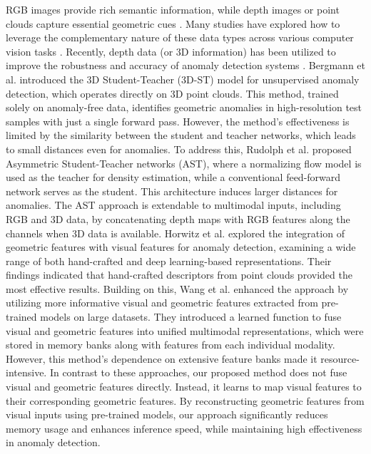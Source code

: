 RGB images provide rich semantic information, while depth images or point clouds capture essential geometric cues \DIFaddbegin {}\DIFaddend . Many studies have explored how to leverage the complementary nature of these data types across various computer vision tasks \DIFaddbegin {}\DIFaddend . Recently, depth data (or 3D information) has been utilized to improve the robustness and accuracy of anomaly detection systems \cite{horwitz2022empirical, wang2023multimodal}. Bergmann et al. \cite{bergmann2023anomaly} introduced the 3D Student-Teacher (3D-ST) model for unsupervised anomaly detection, which operates directly on 3D point clouds. This method, trained solely on anomaly-free data, identifies geometric anomalies in high-resolution test samples with just a single forward pass. However, the method's effectiveness is limited by the similarity between the student and teacher networks, which leads to small distances even for anomalies. To address this, Rudolph et al. \cite{rudolph2023asymmetric} proposed Asymmetric Student-Teacher networks (AST), where a normalizing flow model is used as the teacher for density estimation, while a conventional feed-forward network serves as the student. This architecture induces larger distances for anomalies. The AST approach is extendable to multimodal inputs, including RGB and 3D data, by concatenating depth maps with RGB features along the channels when 3D data is available. Horwitz et al. \cite{horwitz2023back} explored the integration of geometric features with visual features for anomaly detection, examining a wide range of both hand-crafted and deep learning-based representations. Their findings indicated that hand-crafted descriptors from point clouds provided the most effective results. Building on this, Wang et al. \cite{wang2023multimodal} enhanced the approach by utilizing more informative visual and geometric features extracted from pre-trained models on large datasets. They introduced a learned function to fuse visual and geometric features into unified multimodal representations, which were stored in memory banks along with features from each individual modality. However, this method's dependence on extensive feature banks made it resource-intensive. In contrast to these approaches, our proposed method does not fuse visual and geometric features directly. Instead, it learns to map visual features to their corresponding geometric features. By reconstructing geometric features from visual inputs using pre-trained models, our approach significantly reduces memory usage and enhances inference speed, while maintaining high effectiveness in anomaly detection.